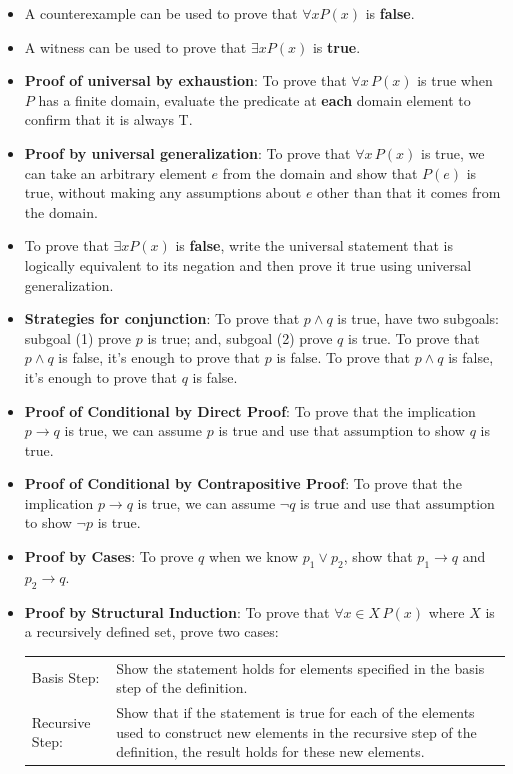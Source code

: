 \begin{itemize}
    \item A counterexample can be used to prove that  $\forall x P(x)$ is {\bf false}.
    \item  A witness can be used  to  prove that  $\exists x P(x)$ is {\bf true}.
    \item {\bf Proof of universal by exhaustion}: To prove that $\forall x \, P(x)$
is true when $P$ has a finite domain, evaluate the predicate at {\bf each} domain element to confirm that it is always T.
    \item  {\bf Proof by universal generalization}: To prove that $\forall x \, P(x)$
is true, we can take an arbitrary element $e$ from the domain and show that $P(e)$ is true, without making any assumptions about $e$ other than that it comes from the domain.
    \item To  prove  that $\exists x P(x)$ is {\bf false}, write the universal statement that is logically equivalent to its negation and then prove it true using universal generalization.
    
\newpage
    \item {\bf Strategies for conjunction}: To prove that $p \land q$ is true, have two subgoals: subgoal (1) prove $p$ 
is  true; and, subgoal (2) prove $q$ is true. To prove that $p \land q$ is false, it's enough to prove that $p$ is false.
 To prove that $p \land q$ is false, it's enough to prove that $q$ is false.
    \item {\bf Proof of Conditional by Direct Proof}: To prove that the implication $p \to q$ is true, we can assume $p$ is true and use that assumption to show $q$ is true.
    \item {\bf Proof of Conditional by Contrapositive Proof}: To prove that the implication $p \to q$ is true, we can assume $\neg q$ is true and use that assumption to show $\neg p$ is true.
    \item {\bf Proof by Cases}: To prove $q$ when we know $p_1 \lor p_2$, show that $p_1 \to q$ and $p_2 \to q$.
    \item  
    {\bf Proof by Structural Induction}: To prove that $\forall x \in X \, P(x)$ where $X$ is a recursively defined set, prove two cases:
        
        \begin{tabularx}{\textwidth}{l X}
        Basis Step: & Show the statement holds for elements specified in the basis step of the definition. \\
        Recursive Step: & Show that if the statement is true for each of the elements used to construct
    new elements in the recursive step of the definition, the result holds for these new elements.
    \end{tabularx}
    

\end{itemize}
